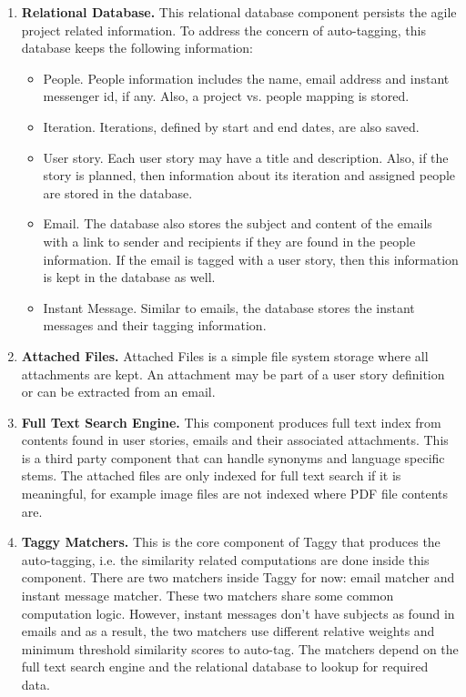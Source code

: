 \begin{enumerate}
	\item \textbf{Relational Database.} This relational database component persists the agile project related information. To address the concern of auto-tagging, this database keeps the following information:
		\begin{itemize}
			\item People. People information includes the name, email address and instant messenger id, if any. Also, a project vs. people mapping is stored.
			\item Iteration. Iterations, defined by start and end dates, are also saved.
			\item User story. Each user story may have a title and description. Also, if the story is planned, then information about its iteration and assigned people are stored in the database.
			\item Email. The database also stores the subject and content of the emails with a link to sender and recipients if they are found in the people information. If the email is tagged with a user story, then this information is kept in the database as well.
			\item Instant Message. Similar to emails, the database stores the instant messages and their tagging information.
		\end{itemize}

	 \item \textbf{Attached Files.} Attached Files is a simple file system storage where all attachments are kept. An attachment may be part of a user story definition or can be extracted from an email.
	
	 \item \textbf{Full Text Search Engine.} This component produces full text index from contents found in user stories, emails and their associated attachments. This is a third party component that can handle synonyms and language specific stems. The attached files are only indexed for full text search if it is meaningful, for example image files are not indexed where PDF file contents are.
	
	\item \textbf{Taggy Matchers.} This is the core component of Taggy that produces the auto-tagging, i.e. the similarity related computations are done inside this component. There are two matchers inside Taggy for now: email matcher and instant message matcher. These two matchers share some common computation logic. However, instant messages don't have subjects as found in emails and as a result, the two matchers use different relative weights and minimum threshold similarity scores to auto-tag. The matchers depend on the full text search engine and the relational database to lookup for required data.
	

\end{enumerate}
